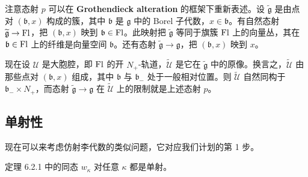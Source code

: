 
注意态射 $p$ 可以在 \textbf{Grothendieck alteration} 的框架下重新表述。设 $\widetilde{\mathfrak{g}}$ 是由点对 $(\mathfrak{b},x)$ 构成的簇，其中 $\mathfrak{b}$ 是 $\mathfrak{g}$ 中的 Borel 子代数，$x\in\mathfrak{b}$。有自然态射 $\widetilde{\mathfrak{g}}\to\operatorname{Fl}$，把 $(\mathfrak{b},x)$ 映到 $\mathfrak{b}\in\operatorname{Fl}$。此映射把 $\widetilde{\mathfrak{g}}$ 等同于旗簇 $\operatorname{Fl}$ 上的向量丛，其在 $\mathfrak{b}\in\operatorname{Fl}$ 上的纤维是向量空间 $\mathfrak{b}$。还有态射 $\widetilde{\mathfrak{g}}\to\mathfrak{g}$，把 $(\mathfrak{b},x)$ 映到 $x$。

现在设 $\mathcal{U}$ 是大胞腔，即 $\operatorname{Fl}$ 的开 $N_+$-轨道，$\widetilde{\mathcal{U}}$ 是它在 $\widetilde{\mathfrak{g}}$ 中的原像。换言之，$\widetilde{\mathcal{U}}$ 由那些点对 $(\mathfrak{b},x)$ 组成，其中 $\mathfrak{b}$ 与 $\mathfrak{b}_-$ 处于一般相对位置。则 $\widetilde{\mathcal{U}}$ 自然同构于 $\mathfrak{b}_-\times N_+$，而态射 $\widetilde{\mathfrak{g}}\to\mathfrak{g}$ 在 $\widetilde{\mathcal{U}}$ 上的限制就是上述态射 $p$。


\subsection{单射性}

现在可以来考虑仿射李代数的类似问题，它对应我们计划的第 1 步。

\begin{proposition}
    定理 6.2.1 中的同态 $w_\kappa$ 对任意 $\kappa$ 都是单射。
\end{proposition}

